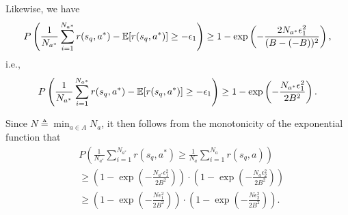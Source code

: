 \begin{myproof}
Likewise, we have
\begin{align}
    P \left( \frac{1}{N_{a^*}}  \sum_{i=1}^{N_{a^*}} r(s_q, a^*) - {\mathbb E}[ r(s_q, a^*)] \geq -\epsilon_1 \right) \geq 1 - \exp \left( - \frac{2N_{a^*} \epsilon_1^2}{(B- (-B))^2} \right),
\end{align}
i.e.,
\begin{align}
    P \left( \frac{1}{N_{a^*}}  \sum_{i=1}^{N_{a^*}} r(s_q, a^*) - {\mathbb E}[ r(s_q, a^*)] \geq -\epsilon_1 \right) \geq 1 - \exp \left( - \frac{N_{a^*} \epsilon_1^2}{2B^2} \right).
\end{align}




Since $N\triangleq \min_{a \in A}  N_a$, it then follows from the monotonicity of the exponential function that
\begin{align}
    &P \left( \frac{1}{N_{a^*}}  \sum_{i=1}^{N_{a^*}} r(s_q, a^*) \geq \frac{1}{N_{a}} \sum_{i=1}^{N_{a}}  r(s_q, a) \right) \nonumber \\
    &\geq \left( 1 - \exp \left( - \frac{N_{a^*} \epsilon_1^2}{2B^2} \right) \right) \cdot \left( 1 - \exp \left( - \frac{N_{a} \epsilon_2^2}{2B^2} \right) \right) \\
    &\geq \left( 1 - \exp \left( - \frac{N \epsilon_1^2}{2B^2} \right) \right) \cdot \left( 1 - \exp \left( - \frac{N \epsilon_2^2}{2B^2} \right) \right).
\end{align}



\end{myproof}
